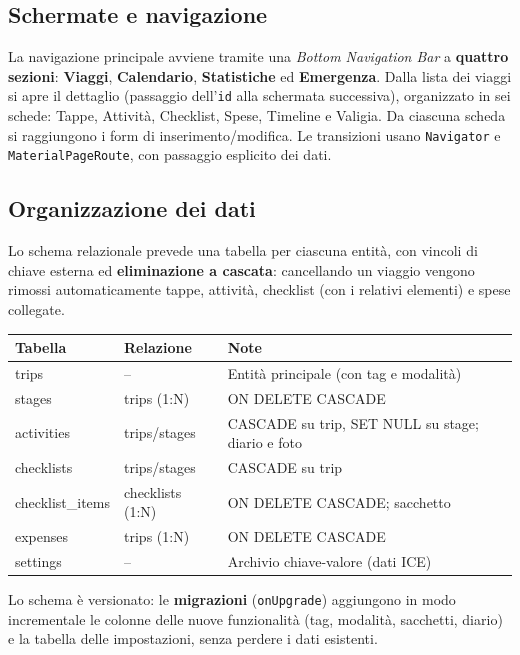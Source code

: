 \documentclass[11pt, a4paper]{article}
\begin{document}
\subsection{Schermate e navigazione}
La navigazione principale avviene tramite una \textit{Bottom Navigation Bar} a
\textbf{quattro sezioni}: \textbf{Viaggi}, \textbf{Calendario},
\textbf{Statistiche} ed \textbf{Emergenza}. Dalla lista dei viaggi si apre il
dettaglio (passaggio dell'\texttt{id} alla schermata successiva), organizzato in
sei schede: Tappe, Attività, Checklist, Spese, Timeline e Valigia. Da ciascuna
scheda si raggiungono i form di inserimento/modifica. Le transizioni usano
\texttt{Navigator} e \texttt{MaterialPageRoute}, con passaggio esplicito dei dati.

\subsection{Organizzazione dei dati}
Lo schema relazionale prevede una tabella per ciascuna entità, con vincoli di
chiave esterna ed \textbf{eliminazione a cascata}: cancellando un viaggio vengono
rimossi automaticamente tappe, attività, checklist (con i relativi elementi) e
spese collegate.

\begin{table}[h!]
    \centering
    \renewcommand{\arraystretch}{1.3}
    \begin{tabularx}{\textwidth}{l l X}
        \toprule
        \textbf{Tabella} & \textbf{Relazione} & \textbf{Note} \\
        \midrule
        trips & -- & Entità principale (con tag e modalità) \\
        stages & trips (1:N) & ON DELETE CASCADE \\
        activities & trips/stages & CASCADE su trip, SET NULL su stage; diario e foto \\
        checklists & trips/stages & CASCADE su trip \\
        checklist\_items & checklists (1:N) & ON DELETE CASCADE; sacchetto \\
        expenses & trips (1:N) & ON DELETE CASCADE \\
        settings & -- & Archivio chiave-valore (dati ICE) \\
        \bottomrule
    \end{tabularx}
\end{table}

\noindent Lo schema è versionato: le \textbf{migrazioni} (\texttt{onUpgrade})
aggiungono in modo incrementale le colonne delle nuove funzionalità (tag,
modalità, sacchetti, diario) e la tabella delle impostazioni, senza perdere i
dati esistenti.
\end{document}
